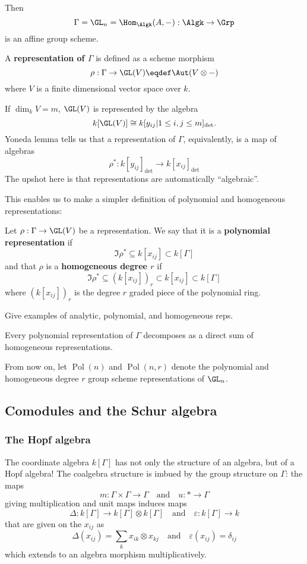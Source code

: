 \documentclass[12pt]{article}
\DeclareMathOperator{\Pol}{Pol}
\begin{document}
	Then 
	\[\Gamma=\GL_n=\Hom_{\Algk}(A,-):\Algk\to\Grp\]
	is an affine group scheme. 
	\begin{defn}
		A \textbf{representation of $\Gamma$} is defined as a scheme morphism 
		\[\rho:\Gamma\to \GL(V)\eqdef \Aut(V\otimes -)\]
		where $V$ is a finite dimensional vector space over $k$.
	\end{defn}
	\begin{rmk}
		If $\dim_k V=m$, $\GL(V)$ is represented by the algebra 
		\[k[\GL(V)]\cong k[y_{ij}|1\le i,j\le m]_{\det}.\]
		Yoneda lemma tells us that a representation of $\Gamma$, equivalently, is a map of algebras 
		\[\rho^\ast:k[y_{ij}]_{\det}\to k[x_{ij}]_{\det}\]
		The upshot here is that representations are automatically ``algebraic''.
	\end{rmk}
	This enables us to make a simpler definition of polynomial and homogeneous representations:
	\begin{defn}
		Let $\rho:\Gamma\to \GL(V)$ be a representation. We say that it is a \textbf{polynomial representation} if 
		\[\Im \rho^\ast\subseteq k[x_{ij}]\subset k[\Gamma]\]
		and that $\rho$ is a \textbf{homogeneous degree $r$} if 
		\[\Im\rho^\ast\subseteq (k[x_{ij}])_r\subset k[x_{ij}]\subset k[\Gamma]\]
		where $(k[x_{ij}])_r$ is the degree $r$ graded piece of the polynomial ring.
	\end{defn}
	{\color{red} Give examples of analytic, polynomial, and homogeneous reps.}
	\begin{thm}[Schur]
		Every polynomial representation of $\Gamma$ decomposes as a direct sum of homogeneous representations.
	\end{thm}

	\begin{defn}
		From now on, let $\Pol(n)$ and $\Pol(n,r)$ denote the polynomial and homogeneous degree $r$ group scheme 
		representations of $\GL_n$.
	\end{defn}

	\subsection{Comodules and the Schur algebra}
		\subsubsection{The Hopf algebra}
		The coordinate algebra $k[\Gamma]$ has not only the structure of an algebra, but of a Hopf algebra!
		The coalgebra structure is imbued by the group structure on $\Gamma$: the maps 
		\[m:\Gamma\times\Gamma\to \Gamma\quad\text{and}\quad u:\ast\to \Gamma\]
		giving multiplication and unit maps induces maps 
		\[\Delta:k[\Gamma]\to k[\Gamma]\otimes k[\Gamma]\quad\text{and}\quad \varepsilon:k[\Gamma]\to k\]
		that are given on the $x_{ij}$ as 
		\[\Delta(x_{ij})=\sum_k x_{ik}\otimes x_{kj}\quad\text{and}\quad \varepsilon(x_{ij})=\delta_{ij}\]
		which extends to an algebra morphism multiplicatively.
\end{document}
